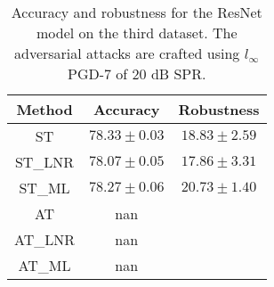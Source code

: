 \documentclass[conference]{IEEEtran}
\begin{document}
\begin{table}[htbp]
	\centering
	\begin{tabular}{c|cc}
	    Method & Accuracy & Robustness \\
		\hline
		ST & $78.33 \pm 0.03$ & $18.83 \pm 2.59$ \\ 
		ST\_LNR & $78.07 \pm 0.05$ & $17.86 \pm 3.31$ \\ 
		ST\_ML & $78.27 \pm 0.06$ & $20.73 \pm 1.40$ \\ 
		AT & nan \\ 
		AT\_LNR & nan \\ 
		AT\_ML & nan \\ 
    \end{tabular}
    \caption{Accuracy and robustness for the ResNet model on the third dataset. The adversarial attacks are crafted using $l_{\infty}$ PGD-7 of 20 dB SPR.}
    \label{tab:sp0c20}
\end{table}





\end{document}
